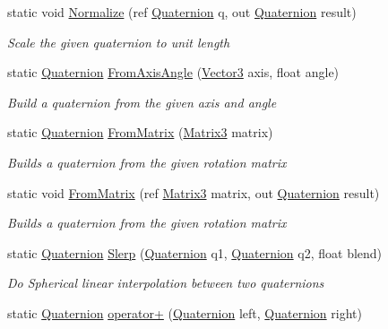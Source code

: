 \begin{DoxyCompactItemize}
static void \hyperlink{struct_open_t_k_1_1_quaternion_a1346d52ee04b407b038aa7e3e07ff955}{Normalize} (ref \hyperlink{struct_open_t_k_1_1_quaternion}{Quaternion} q, out \hyperlink{struct_open_t_k_1_1_quaternion}{Quaternion} result)
\begin{DoxyCompactList}\small\item\em Scale the given quaternion to unit length \end{DoxyCompactList}\item 
static \hyperlink{struct_open_t_k_1_1_quaternion}{Quaternion} \hyperlink{struct_open_t_k_1_1_quaternion_aed64b65ba3e40a4155907038fe0e361a}{From\-Axis\-Angle} (\hyperlink{struct_open_t_k_1_1_vector3}{Vector3} axis, float angle)
\begin{DoxyCompactList}\small\item\em Build a quaternion from the given axis and angle \end{DoxyCompactList}\item 
static \hyperlink{struct_open_t_k_1_1_quaternion}{Quaternion} \hyperlink{struct_open_t_k_1_1_quaternion_a25e810d6f864d1ac1f21bfb617197072}{From\-Matrix} (\hyperlink{struct_open_t_k_1_1_matrix3}{Matrix3} matrix)
\begin{DoxyCompactList}\small\item\em Builds a quaternion from the given rotation matrix \end{DoxyCompactList}\item 
static void \hyperlink{struct_open_t_k_1_1_quaternion_a5fef0adb952afd3c0495ce3b3f5b95df}{From\-Matrix} (ref \hyperlink{struct_open_t_k_1_1_matrix3}{Matrix3} matrix, out \hyperlink{struct_open_t_k_1_1_quaternion}{Quaternion} result)
\begin{DoxyCompactList}\small\item\em Builds a quaternion from the given rotation matrix \end{DoxyCompactList}\item 
static \hyperlink{struct_open_t_k_1_1_quaternion}{Quaternion} \hyperlink{struct_open_t_k_1_1_quaternion_a113ca4abddf8864c08be7e0f9b6586cd}{Slerp} (\hyperlink{struct_open_t_k_1_1_quaternion}{Quaternion} q1, \hyperlink{struct_open_t_k_1_1_quaternion}{Quaternion} q2, float blend)
\begin{DoxyCompactList}\small\item\em Do Spherical linear interpolation between two quaternions \end{DoxyCompactList}\item 
static \hyperlink{struct_open_t_k_1_1_quaternion}{Quaternion} \hyperlink{struct_open_t_k_1_1_quaternion_a68a96fe08097a18c698a4cbbb335372f}{operator+} (\hyperlink{struct_open_t_k_1_1_quaternion}{Quaternion} left, \hyperlink{struct_open_t_k_1_1_quaternion}{Quaternion} right)

\end{DoxyCompactItemize}

